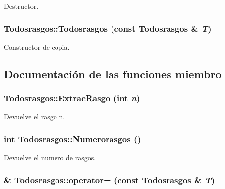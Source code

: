 Destructor. 

\hypertarget{class_todosrasgos_dd3b73c8157166b8162af9d4547a3afc}{
\subsubsection[{Todosrasgos}]{\setlength{\rightskip}{0pt plus 5cm}Todosrasgos::Todosrasgos (const {\bf Todosrasgos} \& {\em T})}}
\label{class_todosrasgos_dd3b73c8157166b8162af9d4547a3afc}


Constructor de copia. 



\subsection{Documentación de las funciones miembro}
\hypertarget{class_todosrasgos_46e0f44b41dacf2a00c6d697e65b35a4}{
\subsubsection[{ExtraeRasgo}]{ Todosrasgos::ExtraeRasgo (int {\em n})}}
\label{class_todosrasgos_46e0f44b41dacf2a00c6d697e65b35a4}


Devuelve el rasgo n. 

\hypertarget{class_todosrasgos_f0d797f1ccf3b1522ff6ab878723e62a}{
\subsubsection[{Numerorasgos}]{\setlength{\rightskip}{0pt plus 5cm}int Todosrasgos::Numerorasgos ()}}
\label{class_todosrasgos_f0d797f1ccf3b1522ff6ab878723e62a}


Devuelve el numero de rasgos. 

\hypertarget{class_todosrasgos_9a31115888d9c9df499b010c6024f450}{
\subsubsection[{operator=}]{ \& Todosrasgos::operator= (const {\bf Todosrasgos} \& {\em T})}}
\label{class_todosrasgos_9a31115888d9c9df499b010c6024f450}


